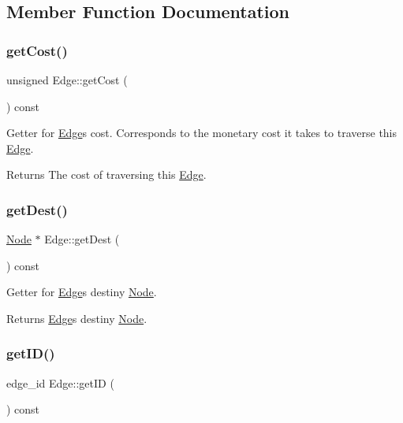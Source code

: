 \subsection{Member Function Documentation}
\hypertarget{class_edge_ac047f6b04f3cb9b590058a2a96e303e7}{}\label{class_edge_ac047f6b04f3cb9b590058a2a96e303e7} 
\subsubsection{\texorpdfstring{get\+Cost()}{getCost()}}
{\footnotesize\ttfamily unsigned Edge\+::get\+Cost (\begin{DoxyParamCaption}{ }\end{DoxyParamCaption}) const}

Getter for \hyperlink{class_edge}{Edge}\textquotesingle{}s cost. Corresponds to the monetary cost it takes to traverse this \hyperlink{class_edge}{Edge}.

\begin{DoxyReturn}{Returns}
The cost of traversing this \hyperlink{class_edge}{Edge}. 
\end{DoxyReturn}
\hypertarget{class_edge_af2cd0f7cba34228f76c4b20a84a2de9d}{}\label{class_edge_af2cd0f7cba34228f76c4b20a84a2de9d} 
\subsubsection{\texorpdfstring{get\+Dest()}{getDest()}}
{\footnotesize\ttfamily \hyperlink{class_node}{Node} $\ast$ Edge\+::get\+Dest (\begin{DoxyParamCaption}{ }\end{DoxyParamCaption}) const}

Getter for \hyperlink{class_edge}{Edge}\textquotesingle{}s destiny \hyperlink{class_node}{Node}.

\begin{DoxyReturn}{Returns}
\hyperlink{class_edge}{Edge}\textquotesingle{}s destiny \hyperlink{class_node}{Node}. 
\end{DoxyReturn}
\hypertarget{class_edge_afb88989f2a1b21bdd1d5aaa4054486c3}{}\label{class_edge_afb88989f2a1b21bdd1d5aaa4054486c3} 
\subsubsection{\texorpdfstring{get\+I\+D()}{getID()}}
{\footnotesize\ttfamily edge\+\_\+id Edge\+::get\+ID (\begin{DoxyParamCaption}{ }\end{DoxyParamCaption}) const}

